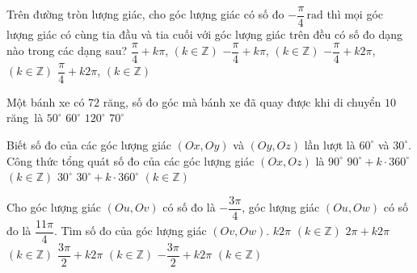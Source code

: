 \begin{ex}%
	Trên đường tròn lượng giác, cho góc lượng giác có số đo $-\dfrac{\pi}{4} \, \mathrm{rad}$ thì mọi góc lượng giác có cùng tia đầu và tia cuối với góc lượng giác trên đều có số đo dạng  nào trong các dạng sau?
	\choice 
		{$\dfrac{\pi}{4} + k\pi$, $\left(k \in  \mathbb{Z}\right)$}
		{$-\dfrac{\pi}{4} + k\pi$, $\left(k \in  \mathbb{Z}\right)$}
		 {\True $-\dfrac{\pi}{4} + k2\pi$, $\left(k \in \mathbb{Z}\right)$}
		 {$\dfrac{\pi}{4} + k2\pi$, $\left(k \in \mathbb{Z}\right)$}
\end{ex}

\begin{ex}%
	Một bánh xe có $72$ răng, số đo góc mà bánh xe đã quay  được khi di chuyển $10$ răng~là
	 \choice
		{\True $50^\circ$} 
		 {$60^\circ$}
		 {$120^\circ$}
		 {$70^\circ$}
\end{ex}

\begin{ex}%
	Biết số đo của các góc  lượng giác $(Ox, Oy)$ và $(Oy, Oz)$ lần lượt là $60^{\circ}$ và $30^{\circ}$. Công thức tổng quát số đo của các góc lượng giác $(Ox, Oz)$ là
	\choice 
		 {$90^\circ$}
		{\True  $90^{\circ}+k \cdot 360^{\circ}$ $(k \in \mathbb{Z})$}
		 {$30^{\circ}$}
		{$30^\circ+k \cdot 360^{\circ}$  $(k \in \mathbb{Z})$}
\end{ex}

\begin{ex}%
	Cho góc lượng giác $(Ou, Ov)$ có số đo là $-\dfrac{3\pi}{4}$, góc lượng giác $(Ou, Ow)$ có số đo  là $\dfrac{11\pi}{4}$. Tìm số đo của góc lượng giác $(Ov, Ow)$.
	 \choice
		{$k 2\pi$  $(k \in \mathbb{Z})$}
		{$2\pi+k  2\pi$ $(k \in \mathbb{Z})$}
		{\True $\dfrac{3\pi}{2}+k 2\pi$ $(k  \in \mathbb{Z})$}
		{$-\dfrac{3\pi}{2}+k 2\pi$  $(k \in \mathbb{Z})$}
\end{ex}

